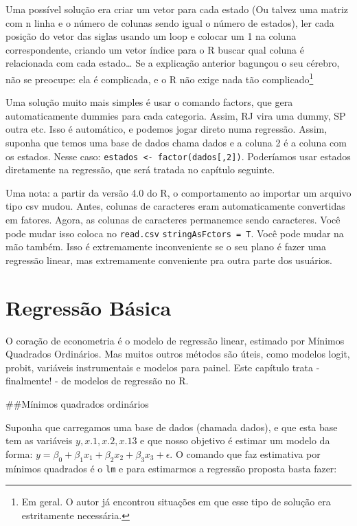 \documentclass[
]{book}
\begin{document}
Uma possível solução era criar um vetor para cada estado (Ou talvez uma matriz com n linha e o número de colunas sendo igual o número de estados), ler cada posição do vetor das siglas usando um loop e colocar um 1 na coluna correspondente, criando um vetor índice para o R buscar qual coluna é relacionada com cada estado\ldots{} Se a explicação anterior bagunçou o seu cérebro, não se preocupe: ela é complicada, e o R não exige nada tão complicado\footnote{Em geral. O autor já encontrou situações em que esse tipo de solução era estritamente necessária.}

Uma solução muito mais simples é usar o comando factors, que gera automaticamente dummies para cada categoria. Assim, RJ vira uma dummy, SP outra etc. Isso é automático, e podemos jogar direto numa regressão. Assim, suponha que temos uma base de dados chama dados e a coluna 2 é a coluna com os estados. Nesse caso: \texttt{estados\ \textless{}-\ factor(dados{[},2{]})}. Poderíamos usar estados diretamente na regressão, que será tratada no capítulo seguinte.

Uma nota: a partir da versão 4.0 do R, o comportamento ao importar um arquivo tipo csv mudou. Antes, colunas de caracteres eram automaticamente convertidas em fatores. Agora, as colunas de caracteres permanemce sendo caracteres. Você pode mudar isso coloca no \texttt{read.csv} \texttt{stringAsFctors\ =\ T}. Você pode mudar na mão também. Isso é extremamente inconveniente se o seu plano é fazer uma regressão linear, mas extremamente conveniente pra outra parte dos usuários.

\hypertarget{regressuxe3o-buxe1sica}{%
\chapter{Regressão Básica}\label{regressuxe3o-buxe1sica}}

O coração de econometria é o modelo de regressão linear, estimado por Mínimos Quadrados Ordinários. Mas muitos outros métodos são úteis, como modelos logit, probit, variáveis instrumentais e modelos para painel. Este capítulo trata - finalmente! - de modelos de regressão no R.

\#\#Mínimos quadrados ordinários

Suponha que carregamos uma base de dados (chamada dados), e que esta base tem as variáveis \(y, x.1,x.2,x.13\) e que nosso objetivo é estimar um modelo da forma: \(y = \beta_0 + \beta_1 x_1 + \beta_2 x_2 + \beta_3 x_3 + \epsilon\). O comando que faz estimativa por mínimos quadrados é o \texttt{lm} e para estimarmos a regressão proposta basta fazer:
\end{document}
